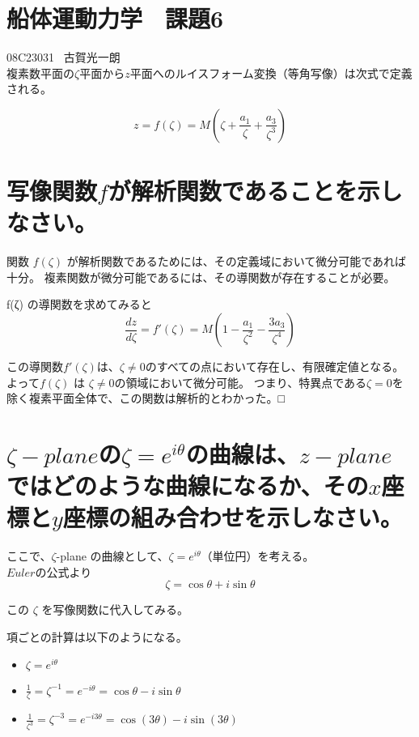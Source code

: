 \documentclass[a4paper, 11pt]{bxjsarticle}
\begin{document}
\section*{船体運動力学　課題6}
08C23031 \ 古賀光一朗\\
\vspace{5mm}
複素数平面の$\zeta$平面から$z$平面へのルイスフォーム変換（等角写像）は次式で定義される。

\begin{equation}
    \label{eq:z1}
    z=f(\zeta)=M(\zeta+\frac{a_1}{\zeta}+\frac{a_3}{\zeta^3})
\end{equation}

\section{写像関数$f$が解析関数であることを示しなさい。}

関数 $f(\zeta)$ が解析関数であるためには、その定義域において微分可能であれば十分。
複素関数が微分可能であるには、その導関数が存在することが必要。

f(ζ) の導関数を求めてみると
\begin{equation}
    \frac{dz}{d\zeta} = f'(\zeta) = M\left(1 - \frac{a_1}{\zeta^2} - \frac{3a_3}{\zeta^4}\right)
\end{equation}


この導関数$f'(\zeta)$は、$\zeta \neq 0$のすべての点において存在し、有限確定値となる。
よって$f(\zeta)$ は $\zeta \neq 0$の領域において微分可能。
つまり、特異点である$\zeta=0$を除く複素平面全体で、この関数は解析的とわかった。□

\section{$\zeta-plane$の$\zeta=e^{i\theta}$の曲線は、$z-plane$ではどのような曲線になるか、その$x$座標と$y$座標の組み合わせを示しなさい。}

ここで、$\zeta$-plane の曲線として、$\zeta=e^{i\theta}$（単位円）を考える。\\
$Euler$の公式より
\begin{equation}
    \zeta = \cos\theta + i\sin\theta
\end{equation}

この $\zeta$ を写像関数に代入してみる。

項ごとの計算は以下のようになる。
\begin{itemize}
    \item $\zeta = e^{i\theta}$
    \item $\frac{1}{\zeta} = \zeta^{-1} = e^{-i\theta} = \cos\theta - i\sin\theta$
    \item $\frac{1}{\zeta^3} = \zeta^{-3} = e^{-i3\theta} = \cos(3\theta) - i\sin(3\theta)$
\end{itemize}
\end{document}
